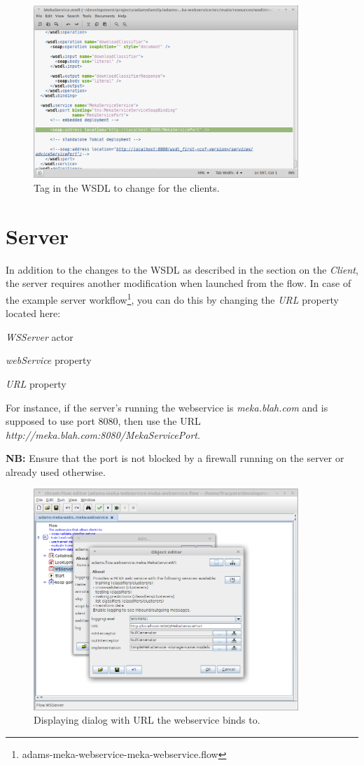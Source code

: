 \documentclass[a4paper]{book}
\begin{document}
\begin{figure}[htb]
  \centering
  \includegraphics[width=10.0cm]{images/client_setup.png}
  \caption{Tag in the WSDL to change for the clients.}
  \label{client_setup}
\end{figure}

\clearpage
\section{Server}
In addition to the changes to the WSDL as described in the section on the 
\textit{Client}, the server requires another modification
when launched from the flow. In case of the example server 
workflow\footnote{adams-meka-webservice-meka-webservice.flow},
you can do this by changing the \textit{URL} property located here:
\begin{tight_itemize}
	\item \textit{WSServer} actor
	\item \textit{webService} property
	\item \textit{URL} property
\end{tight_itemize}
For instance, if the server's running the webservice is \textit{meka.blah.com}
and is supposed to use port 8080, then use the URL 
\textit{http://meka.blah.com:8080/MekaServicePort}. 

\textbf{NB:} Ensure that the port is not blocked by a firewall running on the server
or already used otherwise.

\begin{figure}[htb]
  \centering
  \includegraphics[width=10.0cm]{images/server_setup.png}
  \caption{Displaying dialog with URL the webservice binds to.}
  \label{server_setup}
\end{figure}
\end{document}
